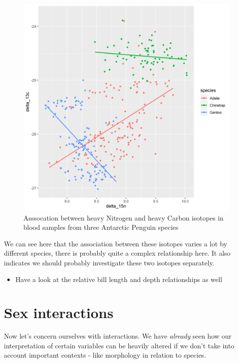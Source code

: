 \documentclass[
]{book}
\providecommand{\tightlist}{%
  \setlength{\itemsep}{0pt}\setlength{\parskip}{0pt}}
\begin{document}
\begin{figure}
\includegraphics[width=1\linewidth]{images/corrplot} \caption{Asssocation between heavy Nitrogen and heavy Carbon isotopes in blood samples from three Antarctic Penguin species}\label{fig:unnamed-chunk-107}
\end{figure}

We can see here that the association between these isotopes varies a lot by different species, there is probably quite a complex relationship here. It also indicates we should probably investigate these two isotopes separately.

\begin{itemize}
\tightlist
\item
  Have a look at the relative bill length and depth relationships as well
\end{itemize}

\hypertarget{sex-interactions}{%
\section{Sex interactions}\label{sex-interactions}}

Now let's concern ourselves with interactions. We have \emph{already} seen how our interpretation of certain variables can be heavily altered if we don't take into account important contexts - like morphology in relation to species.
\end{document}
